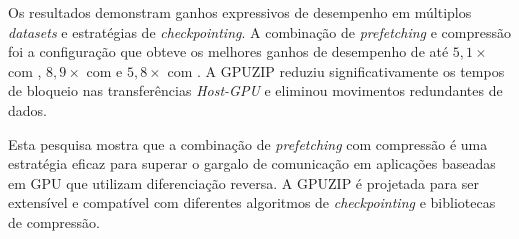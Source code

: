 \documentclass[Ingles]{ic-tese-v3}
\begin{document}
\begin{resumo}
Os resultados demonstram ganhos expressivos de desempenho em múltiplos \textit{datasets} e estratégias de \textit{checkpointing}. A combinação de \textit{prefetching} e compressão foi a configuração que obteve os melhores ganhos de desempenho de até $5,1\times$ com \revolve, $8,9\times$ com \zcut e $5,8\times$ com \uniform. A GPUZIP reduziu significativamente os tempos de bloqueio nas transferências \textit{Host-GPU} e eliminou movimentos redundantes de dados.

Esta pesquisa mostra que a combinação de \textit{prefetching} com compressão é uma estratégia eficaz para superar o gargalo de comunicação em aplicações baseadas em GPU que utilizam diferenciação reversa. A GPUZIP é projetada para ser extensível e compatível com diferentes algoritmos de \textit{checkpointing} e bibliotecas de compressão.




\end{resumo}
\end{document}
